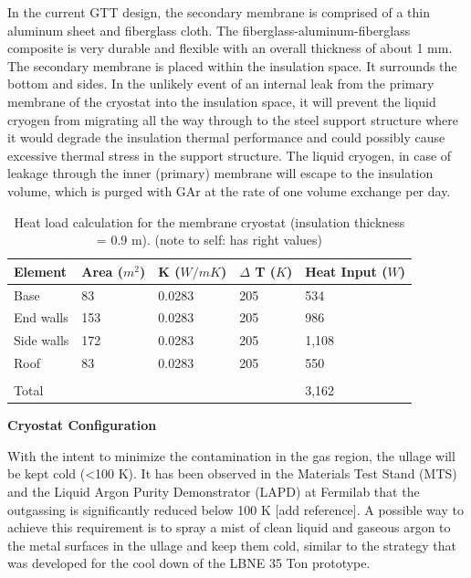 In the current GTT design, the secondary membrane is comprised of a thin aluminum sheet and 
fiberglass cloth. The fiberglass-aluminum-fiberglass composite is very durable and flexible with an 
overall thickness of about 1 mm. The secondary membrane is placed within the insulation space. It 
surrounds the bottom and sides. In the unlikely event of an internal leak from the primary membrane of 
the cryostat into the insulation space, it will prevent the liquid cryogen from migrating all the way 
through to the steel support structure where it would degrade the insulation thermal performance and 
could possibly cause excessive thermal stress in the support structure. The liquid cryogen, in case of 
leakage through the inner (primary) membrane will escape to the insulation volume, which is purged with 
GAr at the rate of one volume exchange per day.

\begin{table}[htpb]
\label{tbl:heat-load-calc}
\centering
\begin{tabular}{|p{}|p{}|p{}|p{}|p{}|}
\hline
 \textbf{Element} & \textbf{Area ($m^2$)}  &  \textbf{K ($W/mK$)} & \textbf{$\Delta$ T ($K$)}
 & \textbf{Heat Input ($W$)}\\ \hline
Base   & 83  & 0.0283   &205   & 534 \\ \hline
End walls  &  153 & 0.0283  &  205 &  986 \\ \hline
Side walls   & 172  & 0.0283  &  205 & 1,108 \\ \hline
Roof  &  83 & 0.0283  & 205  &  550\\ \hline
   &   &   &   &  \\ \hline
Total   &   &   &   & 3,162 \\ \hline
\end{tabular}
\caption{Heat load calculation for the membrane cryostat (insulation thickness = 0.9 m). (note to self: has right values)}
\end{table}

\textbf{Cryostat Configuration}

With the intent to minimize the contamination in the gas region, the ullage will be kept cold (\textless 100 K). It has been observed in the Materials Test Stand (MTS) and the Liquid Argon Purity Demonstrator (LAPD) at Fermilab that the outgassing is significantly reduced below 100 K [add reference]. A possible way to achieve this requirement is to spray a mist of clean liquid and gaseous argon to the metal surfaces in the ullage and keep them cold, similar to the strategy that was developed for the cool down of the LBNE 35 Ton prototype.

